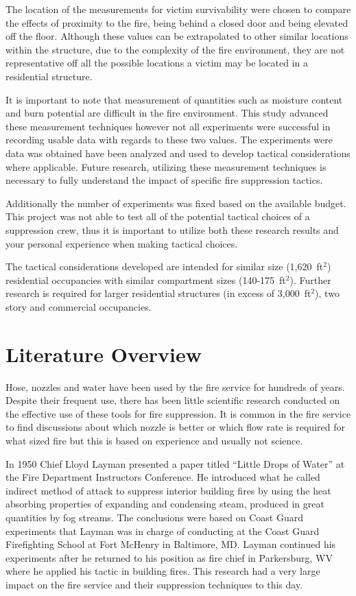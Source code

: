 \documentclass[12pt,oneside]{book}
\begin{document}
The location of the measurements for victim survivability were chosen to compare the effects of proximity to the fire, being behind a closed door and being elevated off the floor. Although these values can be extrapolated to other similar locations within the structure, due to the complexity of the fire environment, they are not representative off all the possible locations a victim may be located in a residential structure.  

It is important to note that measurement of quantities such as moisture content and burn potential are difficult in the fire environment. This study advanced these measurement techniques however not all experiments were successful in recording usable data with regards to these two values. The experiments were data was obtained have been analyzed and used to develop tactical considerations where applicable. Future research, utilizing these measurement techniques is necessary to fully understand the impact of specific fire suppression tactics. 

Additionally the number of experiments was fixed based on the available budget. This project was not able to test all of the potential tactical choices of a suppression crew, thus it is important to utilize both these research results and your personal experience when making tactical choices.  

The tactical considerations developed are intended for similar size (1,620~ft$^2$) residential occupancies with similar compartment sizes (140-175~ft$^2$). Further research is required for larger residential structures (in excess of 3,000~ft$^2$), two story and commercial occupancies.

\clearpage

\chapter{Literature Overview}

Hose, nozzles and water have been used by the fire service for hundreds of years. Despite their frequent use, there has been little scientific research conducted on the effective use of these tools for fire suppression. It is common in the fire service to find discussions about which nozzle is better or which flow rate is required for what sized fire but this is based on experience and usually not science. 

In 1950 Chief Lloyd Layman presented a paper titled “Little Drops of Water” at the Fire Department Instructors Conference. He introduced what he called indirect method of attack to suppress interior building fires by using the heat absorbing properties of expanding and condensing steam, produced in great quantities by fog streams. The conclusions were based on Coast Guard experiments that Layman was in charge of conducting at the Coast Guard Firefighting School at Fort McHenry in Baltimore, MD. Layman continued his experiments after he returned to his position as fire chief in Parkersburg, WV where he applied his tactic in building fires.  This research had a very large impact on the fire service and their suppression techniques to this day. 
\end{document}
